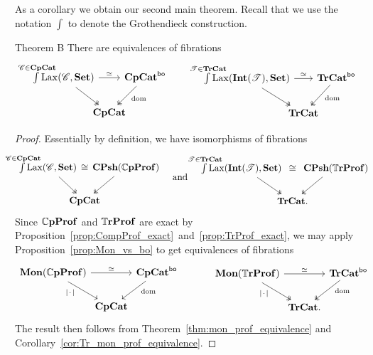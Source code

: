 \documentclass[11pt,oneside,article]{memoir}
\begin{document}
As a corollary we obtain our second main theorem. Recall that we use the notation $\int$ to denote
the Grothendieck construction.

\begin{named}{Theorem B}
    \label{thm:TheoremB}
  There are equivalences of fibrations
  \begin{equation*}
    \begin{tikzcd}[column sep=-1em]
      \int\limits^{\mathclap{\cat{C}\in\CompCat}} \Lax(\cat{C},\Set)
          \ar[rr,"\equiv"] \ar[dr,two heads]
        && \CompCat^{\bo} \ar[dl,two heads,"\dom" pos=.4] \\
      & \CompCat &
    \end{tikzcd}
    \qquad\quad
    \begin{tikzcd}[column sep=-1em]
      \int\limits^{\mathclap{\cat{T}\in\TrCat}} \Lax(\Int(\cat{T}),\Set)
          \ar[rr,"\equiv"] \ar[dr,two heads]
        && \TrCat^{\bo} \ar[dl,two heads,"\dom" pos=.4] \\
      & \TrCat &
    \end{tikzcd}
  \end{equation*}
\end{named}
\begin{proof}
  Essentially by definition, we have isomorphisms of fibrations
  \begin{equation*}
    \begin{tikzcd}[column sep=-2em]
      \int\limits^{\mathclap{\cat{C}\in\CompCat}}\Lax(\cat{C},\Set)~
          \ar[rr,phantom,"\iso"] \ar[dr,two heads]
        && ~\CPsh(\dCompProf) \ar[dl,two heads] \\
      & \CompCat &
    \end{tikzcd}
    \quad\text{and}\quad
    \begin{tikzcd}[column sep=-2em]
      \int\limits^{\mathclap{\cat{T}\in\TrCat}}\Lax(\Int(\cat{T}),\Set)~~
          \ar[rr,phantom,"\iso"] \ar[dr,two heads]
        && ~~\CPsh(\dTrProf) \ar[dl,two heads] \\
      & \TrCat. &
    \end{tikzcd}
  \end{equation*}
  Since $\mathbb{C}\mathbf{pProf}$ and $\mathbb{T}\mathbf{rProf}$ are exact by
  Proposition~\ref{prop:CompProf_exact}~and~\ref{prop:TrProf_exact}, we may apply
  Proposition~\ref{prop:Mon_vs_bo} to get equivalences of fibrations
  \begin{equation*}
    \begin{tikzcd}[column sep=0em]
      \Mon(\dCompProf) \ar[rr,"\equiv"] \ar[dr,"\MOb"' pos=.3]
        && \CompCat^{\bo} \ar[dl,"\dom" pos=.3] \\
      & \CompCat &
    \end{tikzcd}
    \qquad\quad
    \begin{tikzcd}[column sep=0em]
      \Mon(\dTrProf) \ar[rr,"\equiv"] \ar[dr,two heads,"\MOb"' pos=.3]
        && \TrCat^{\bo} \ar[dl,two heads,"\dom" pos=.3] \\
      & \TrCat. &
    \end{tikzcd}
  \end{equation*}
  The result then follows from Theorem~\ref{thm:mon_prof_equivalence} and
  Corollary~\ref{cor:Tr_mon_prof_equivalence}.
\end{proof}
\end{document}
